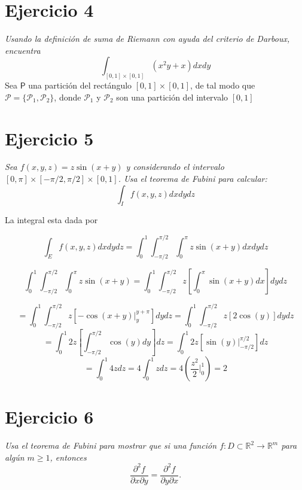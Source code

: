 \documentclass[a4paper,12pt]{article}
\begin{document}
\section{Ejercicio 4}
\textit{Usando la definición de suma de Riemann con ayuda del criterio de Darboux, encuentra}
\[\int_{[0,1] \times [0,1]} (x^2y+x)dxdy\]
Sea $\mathsf{P}$ una partición del rectángulo $[0,1] \times [0,1]$, de tal modo que
$\mathcal{P} = \lbrace \mathcal{P}_1, \mathcal{P}_2 \rbrace$, donde $\mathcal{P}_1$ y $\mathcal{P}_2$ son una partición
del intervalo $[0,1]$

\newpage
\section{Ejercicio 5}
\textit{Sea $f(x,y,z) = z \sin(x+y)$ y considerando el intervalo $[0,\pi]\times[-\pi/2,\pi/2]\times[0,1]$. Usa el teorema
de Fubini para calcular:}
\[\int_{I} f(x,y,z) dxdydz\]


La integral esta dada por

\[\int_{E} f(x,y,z)dxdydz = \int_{0}^{1} \int_{-\pi/2}^{\pi/2} \int_{0}^{\pi} z\sin (x+y) dxdydz\]

\[\int_{0}^{1} \int_{-\pi/2}^{\pi/2} \int_{0}^{\pi} z\sin (x+y) = \int_{0}^{1} \int_{-\pi/2}^{\pi/2} z \left[ \int_{0}^{\pi} \sin (x+y) dx \right] dydz \]

\[ = \int_{0}^{1} \int_{-\pi/2}^{\pi/2} z \left[ -\cos (x+y) \vert_{y}^{y + \pi} \right] dydz = \int_{0}^{1} \int_{-\pi/2}^{\pi/2} z \left[ 2\cos (y)\right] dydz\]
\[ = \int_{0}^{1} 2z\left[\int_{-\pi/2}^{\pi/2}  \cos (y) dy\right] dz =  \int_{0}^{1} 2z\left[\sin(y) \vert_{-\pi/2}^{\pi/2}\right] dz\]
\[ = \int_{0}^{1} 4z dz = 4 \int_{0}^{1} z dz = 4 (\frac{z^2}{2}\vert_{0}^1) = 2 \]

\newpage
\section{Ejercicio 6}
\textit{Usa el teorema de Fubini para mostrar que si una función $f : D \subset \mathbb{R}^2 \rightarrow \mathbb{R}^m$
para algún $m \geq 1$, entonces}
\[\frac{\partial^2 f}{\partial x \partial y} = \frac{\partial^2 f}{\partial y \partial x}.\]
\end{document}
